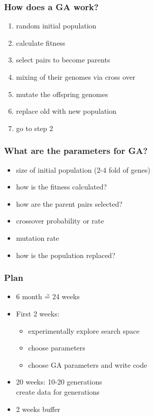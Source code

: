 \documentclass{beamer}
\begin{document}
\begin{frame}
	\frametitle{How does a GA work?}
	\begin{enumerate}
		\item random initial population
		\item calculate fitness
		\item select pairs to become parents
		\item mixing of their genomes via cross over
		\item mutate the offspring genomes
		\item replace old with new population
		\item go to step 2
	\end{enumerate}
\end{frame}

\begin{frame}
	\frametitle{What are the parameters for GA?}
	\begin{itemize}
		\item size of initial population (2-4 fold of genes)
		\item how is the fitness calculated?
		\item how are the parent pairs selected?
		\item crossover probability or rate
		\item mutation rate
		\item how is the population replaced?
	\end{itemize}
\end{frame}

\begin{frame}
	\frametitle{Plan}
	\begin{itemize}
		\item 6 month \~=  24 weeks
		\item First 2 weeks:
			\begin{itemize}
				\item experimentally explore search space
				\item choose parameters
				\item choose GA parameters and write code
			\end{itemize}
		\item 20 weeks: 10-20 generations\\
			create data for generations
		\item 2 weeks buffer
	\end{itemize}
\end{frame}
\end{document}
